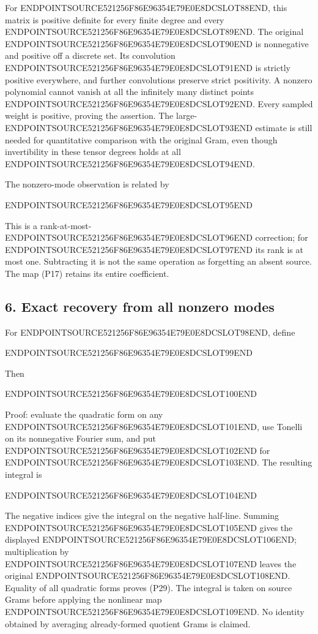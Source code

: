 For ENDPOINTSOURCE521256F86E96354E79E0E8DCSLOT88END, this matrix is positive definite for every finite degree and every ENDPOINTSOURCE521256F86E96354E79E0E8DCSLOT89END. The original ENDPOINTSOURCE521256F86E96354E79E0E8DCSLOT90END is nonnegative and positive off a discrete set. Its convolution ENDPOINTSOURCE521256F86E96354E79E0E8DCSLOT91END is strictly positive everywhere, and further convolutions preserve strict positivity. A nonzero polynomial cannot vanish at all the infinitely many distinct points ENDPOINTSOURCE521256F86E96354E79E0E8DCSLOT92END. Every sampled weight is positive, proving the assertion. The large-ENDPOINTSOURCE521256F86E96354E79E0E8DCSLOT93END estimate is still needed for quantitative comparison with the original Gram, even though invertibility in these tensor degrees holds at all ENDPOINTSOURCE521256F86E96354E79E0E8DCSLOT94END.

The nonzero-mode observation is related by

ENDPOINTSOURCE521256F86E96354E79E0E8DCSLOT95END

This is a rank-at-most-ENDPOINTSOURCE521256F86E96354E79E0E8DCSLOT96END correction; for ENDPOINTSOURCE521256F86E96354E79E0E8DCSLOT97END its rank is at most one. Subtracting it is not the same operation as forgetting an absent source. The map (P17) retains its entire coefficient.

\subsection{6. Exact recovery from all nonzero modes}\label{endpoint-periodized_original--exact-recovery-from-all-nonzero-modes}

For ENDPOINTSOURCE521256F86E96354E79E0E8DCSLOT98END, define

ENDPOINTSOURCE521256F86E96354E79E0E8DCSLOT99END

Then

ENDPOINTSOURCE521256F86E96354E79E0E8DCSLOT100END

Proof: evaluate the quadratic form on any ENDPOINTSOURCE521256F86E96354E79E0E8DCSLOT101END, use Tonelli on its nonnegative Fourier sum, and put ENDPOINTSOURCE521256F86E96354E79E0E8DCSLOT102END for ENDPOINTSOURCE521256F86E96354E79E0E8DCSLOT103END. The resulting integral is

ENDPOINTSOURCE521256F86E96354E79E0E8DCSLOT104END

The negative indices give the integral on the negative half-line. Summing ENDPOINTSOURCE521256F86E96354E79E0E8DCSLOT105END gives the displayed ENDPOINTSOURCE521256F86E96354E79E0E8DCSLOT106END; multiplication by ENDPOINTSOURCE521256F86E96354E79E0E8DCSLOT107END leaves the original ENDPOINTSOURCE521256F86E96354E79E0E8DCSLOT108END. Equality of all quadratic forms proves (P29). The integral is taken on source Grams before applying the nonlinear map ENDPOINTSOURCE521256F86E96354E79E0E8DCSLOT109END. No identity obtained by averaging already-formed quotient Grams is claimed.

